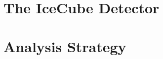 \section{The IceCube Detector}
\label{sec:Detector}

\section{Analysis Strategy}
\label{sec:Strategy}
